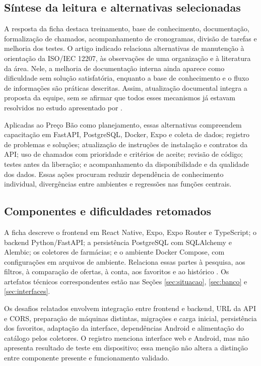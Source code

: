 \subsection{Síntese da leitura e alternativas selecionadas}

A resposta da ficha destaca treinamento, base de conhecimento, documentação, formalização de chamados, acompanhamento de cronogramas, divisão de tarefas e melhoria dos testes. O artigo indicado relaciona alternativas de manutenção à orientação da ISO/IEC 12207, às observações de uma organização e à literatura da área. Nele, a melhoria de documentação interna ainda aparece como dificuldade sem solução satisfatória, enquanto a base de conhecimento e o fluxo de informações são práticas descritas. Assim, atualização documental integra a proposta da equipe, sem se afirmar que todos esses mecanismos já estavam resolvidos no estudo apresentado por .

Aplicadas ao Preço Bão como planejamento, essas alternativas compreendem capacitação em FastAPI, PostgreSQL, Docker, Expo e coleta de dados; registro de problemas e soluções; atualização de instruções de instalação e contratos da API; uso de chamados com prioridade e critérios de aceite; revisão de código; testes antes da liberação; e acompanhamento da disponibilidade e da qualidade dos dados. Essas ações procuram reduzir dependência de conhecimento individual, divergências entre ambientes e regressões nas funções centrais.

\subsection{Componentes e dificuldades retomados}

A ficha descreve o frontend em React Native, Expo, Expo Router e TypeScript; o backend Python/FastAPI; a persistência PostgreSQL com SQLAlchemy e Alembic; os coletores de farmácias; e o ambiente Docker Compose, com configurações em arquivos de ambiente. Relaciona essas partes à pesquisa, aos filtros, à comparação de ofertas, à conta, aos favoritos e ao histórico \cite{pratica01}. Os artefatos técnicos correspondentes estão nas Seções \ref{sec:situacao}, \ref{sec:banco} e \ref{sec:interfaces}.

Os desafios relatados envolvem integração entre frontend e backend, URL da API e CORS, preparação de máquinas distintas, migrações e carga inicial, persistência dos favoritos, adaptação da interface, dependências Android e alimentação do catálogo pelos coletores. O registro menciona interface web e Android, mas não apresenta resultado de teste em dispositivo; essa menção não altera a distinção entre componente presente e funcionamento validado.

